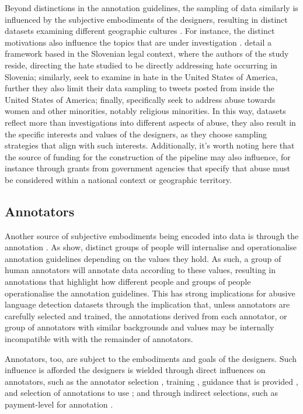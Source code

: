 Beyond distinctions in the annotation guidelines, the sampling of data similarly is influenced by the subjective embodiments of the designers, resulting in distinct datasets examining different geographic cultures \citep{Waseem:2018}. For instance, the distinct motivations also influence the topics that are under investigation \citep{Waseem:2018}. \citet{Fiser:2017} detail a framework based in the Slovenian legal context, where the authors of the study reside, directing the hate studied to be directly addressing hate occurring in Slovenia; similarly, \citet{Davidson:2017} seek to examine in hate in the United States of America, further they also limit their data sampling to tweets posted from inside the United States of America; finally, \citet{Waseem-Hovy:2016} specifically seek to address abuse towards women and other minorities, notably religious minorities.
In this way, datasets reflect more than investigations into different aspects of abuse, they also result in the specific interests and values of the designers, as they choose sampling strategies that align with such interests. Additionally, it's worth noting here that the source of funding for the construction of the pipeline may also influence, for instance through grants from government agencies that specify that abuse must be considered within a national context or geographic territory.

\subsection{Annotators}

Another source of subjective embodiments being encoded into data is through the annotation \citep{Waseem:2016}. As \citet{Waseem:2016} show, distinct groups of people will internalise and operationalise annotation guidelines depending on the values they hold. As such, a group of human annotators will annotate data according to these values, resulting in annotations that highlight how different people and groups of people operationalise the annotation guidelines. This has strong implications for abusive language detection datasets through the implication that, unless annotators are carefully selected and trained, the annotations derived from each annotator, or group of annotators with similar backgrounds and values  may be internally incompatible with with the remainder of annotators.

Annotators, too, are subject to the embodiments and goals of the designers. Such influence is afforded the designers is wielded through direct influences on annotators, such as the annotator selection \citep{Waseem:2016}, training \citep{Vidgen:2020}, guidance that is provided \citep{Palmer:2020}, and selection of annotations to use \citep{Hovy:2013}; and through indirect selections, such as payment-level for annotation \citep{Sabou:2014}.

